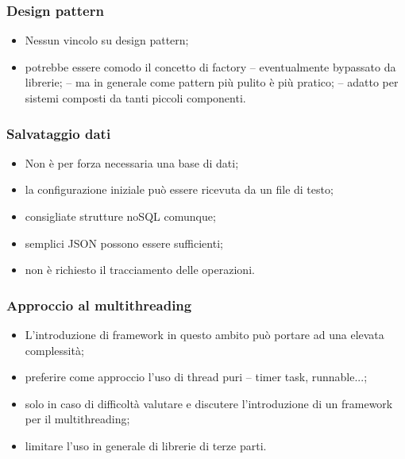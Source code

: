     \subsubsection{Design pattern}
        \begin{itemize}
            \item Nessun vincolo su design pattern;
            \item potrebbe essere comodo il concetto di factory
                \subitem -- eventualmente bypassato da librerie;
                \subitem -- ma in generale come pattern più pulito è più pratico;
                \subitem -- adatto per sistemi composti da tanti piccoli componenti.
        \end{itemize}

    \subsubsection{Salvataggio dati}
        \begin{itemize}
            \item Non è per forza necessaria una base di dati;
            \item la configurazione iniziale può essere ricevuta da un file di testo;
            \item consigliate strutture noSQL comunque;
            \item semplici JSON possono essere sufficienti;
            \item non è richiesto il tracciamento delle operazioni.
        \end{itemize}

    \subsubsection{Approccio al multithreading}
        \begin{itemize}
            \item L'introduzione di framework in questo ambito può portare ad una elevata complessità;
            \item preferire come approccio l'uso di thread puri
                \subitem -- timer task, runnable...;
            \item solo in caso di difficoltà valutare e discutere l'introduzione di un framework per il multithreading;
            \item limitare l'uso in generale di librerie di terze parti.
        \end{itemize}

